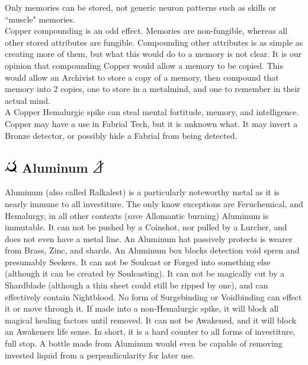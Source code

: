 \documentclass[conference]{IEEEtran}
\begin{document}
Only memories can be stored, not generic neuron patterns such as skills or ``muscle" memories.\\

Copper compounding is an odd effect.  Memories are non-fungible, whereas all other stored attributes are fungible.  Compounding other attributes is as simple as creating more of them, but what this would do to a memory is not clear.  It is our opinion that compounding Copper would allow a memory to be copied.  This would allow an Archivist to store a copy of a memory, then compound that memory into 2 copies, one to store in a metalmind, and one to remember in their actual mind.\\
 
A Copper Hemalurgic spike can steal mental fortitude, memory, and intelligence.\\

Copper may have a use in Fabrial Tech, but it is unknown what.  It may invert a Bronze detector, or possibly hide a Fabrial from being detected.

\subsection*{\includegraphics[height=1em]{images/Aluminum.png}  Aluminum \includegraphics[height=1em]{images/Aluminum_(Feruchemy).png}}
Aluminum (also called Ralkalest) is a particularly noteworthy metal as it is nearly immune to all investiture.  The only know exceptions are Feruchemical, and Hemalurgy, in all other contexts (save Allomantic burning) Aluminum is immutable.  It can not be pushed by a Coinshot, nor pulled by a Lurcher, and does not even have a metal line. An Aluminum hat passively protects is wearer from Brass, Zinc, and shards.  An Aluminum box blocks detection void spren and presumably Seekers.  It can not be Soulcast or Forged into something else (although it can be created by Soulcasting).  It can not be magically cut by a Shardblade (although a thin sheet could still be ripped by one), and can effectively contain Nightblood.  No form of Surgebinding or Voidbinding can effect it or move through it.  If made into a non-Hemalurgic spike, it will block all magical healing factors until removed.  It can not be Awakened, and it will block an Awakeners life sense.  In short, it is a hard counter to all forms of investiture, full stop.  A bottle made from Aluminum would even be capable of removing invested liquid from a perpendicularity for later use.\\
\end{document}
